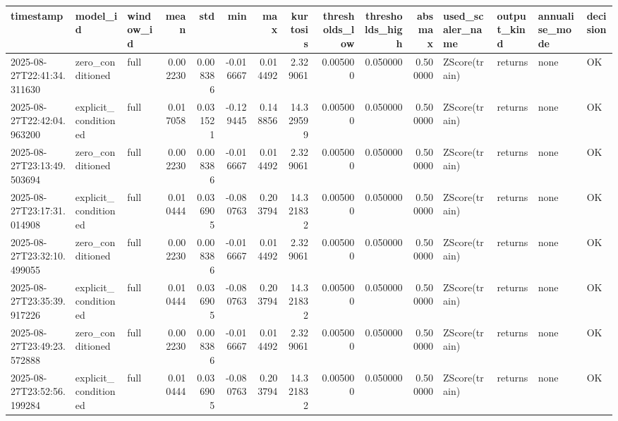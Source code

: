 \begin{tabular}{lllrrrrrrrrllll}
\toprule
timestamp & model_id & window_id & mean & std & min & max & kurtosis & thresholds_low & thresholds_high & absmax & used_scaler_name & output_kind & annualise_mode & decision \\
\midrule
2025-08-27T22:41:34.311630 & zero_conditioned & full & 0.002230 & 0.008386 & -0.016667 & 0.014492 & 2.329061 & 0.005000 & 0.050000 & 0.500000 & ZScore(train) & returns & none & OK \\
2025-08-27T22:42:04.963200 & explicit_conditioned & full & 0.017058 & 0.031521 & -0.129445 & 0.148856 & 14.329599 & 0.005000 & 0.050000 & 0.500000 & ZScore(train) & returns & none & OK \\
2025-08-27T23:13:49.503694 & zero_conditioned & full & 0.002230 & 0.008386 & -0.016667 & 0.014492 & 2.329061 & 0.005000 & 0.050000 & 0.500000 & ZScore(train) & returns & none & OK \\
2025-08-27T23:17:31.014908 & explicit_conditioned & full & 0.010444 & 0.036905 & -0.080763 & 0.203794 & 14.321832 & 0.005000 & 0.050000 & 0.500000 & ZScore(train) & returns & none & OK \\
2025-08-27T23:32:10.499055 & zero_conditioned & full & 0.002230 & 0.008386 & -0.016667 & 0.014492 & 2.329061 & 0.005000 & 0.050000 & 0.500000 & ZScore(train) & returns & none & OK \\
2025-08-27T23:35:39.917226 & explicit_conditioned & full & 0.010444 & 0.036905 & -0.080763 & 0.203794 & 14.321832 & 0.005000 & 0.050000 & 0.500000 & ZScore(train) & returns & none & OK \\
2025-08-27T23:49:23.572888 & zero_conditioned & full & 0.002230 & 0.008386 & -0.016667 & 0.014492 & 2.329061 & 0.005000 & 0.050000 & 0.500000 & ZScore(train) & returns & none & OK \\
2025-08-27T23:52:56.199284 & explicit_conditioned & full & 0.010444 & 0.036905 & -0.080763 & 0.203794 & 14.321832 & 0.005000 & 0.050000 & 0.500000 & ZScore(train) & returns & none & OK \\
\bottomrule
\end{tabular}
